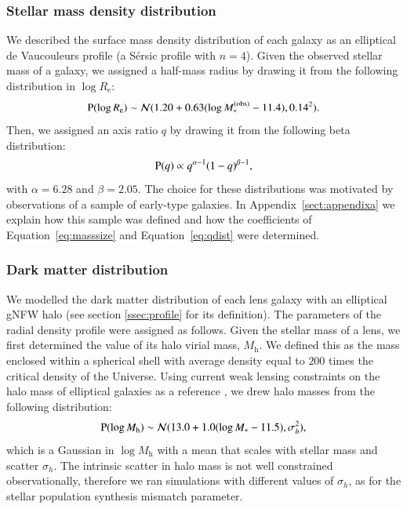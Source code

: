 \documentclass{aa}
\def\reff{R_{\mathrm{e}}}
\def\mstar{M_*}
\def\mobs{M_*^{(\mathrm{obs})}}
\def\mhalo{M_{\mathrm{h}}}
\def\Eref#1{Equation~\ref{#1}\xspace}
\def\pr{{\rm P}}
\begin{document}
\subsubsection{Stellar mass density distribution}

We described the surface mass density distribution of each galaxy as an elliptical de Vaucouleurs profile (a S\'{e}rsic profile with $n=4$).
Given the observed stellar mass of a galaxy, we assigned a half-mass radius by drawing it from the following distribution in $\log{\reff}$:
\begin{equation}\label{eq:masssize}
\pr(\log{\reff}) \sim \mathcal{N}(1.20 + 0.63(\log{\mobs} - 11.4), 0.14^2).
\end{equation}
Then, we assigned an axis ratio $q$ by drawing it from the following beta distribution:
\begin{equation}\label{eq:qdist}
\pr(q) \propto q^{\alpha-1}(1 - q)^{\beta-1},
\end{equation}
with $\alpha=6.28$ and $\beta=2.05$.
The choice for these distributions was motivated by observations of a sample of early-type galaxies. In Appendix~\ref{sect:appendixa} we explain how this sample was defined and how the coefficients of \Eref{eq:masssize} and \Eref{eq:qdist} were determined. 

\subsubsection{Dark matter distribution}\label{ssub:dmprofile}

We modelled the dark matter distribution of each lens galaxy with an elliptical gNFW halo (see section \ref{ssec:profile} for its definition).
The parameters of the radial density profile were assigned as follows.
Given the stellar mass of a lens, we first determined the value of its halo virial mass, $\mhalo$. We defined this as the mass enclosed within a spherical shell with average density equal to $200$ times the critical density of the Universe.
Using current weak lensing constraints on the halo mass of elliptical galaxies as a reference \citep{Son++22}, we drew halo masses from the following distribution:
\begin{equation}
\pr(\log{\mhalo}) \sim \mathcal{N}(13.0 + 1.0(\log{\mstar} - 11.5), \sigma_h^2),
\end{equation}
which is a Gaussian in $\log{\mhalo}$ with a mean that scales with stellar mass and scatter $\sigma_h$.
The intrinsic scatter in halo mass is not well constrained observationally, therefore we ran simulations with different values of $\sigma_h$, as for the stellar population synthesis mismatch parameter.
\end{document}
